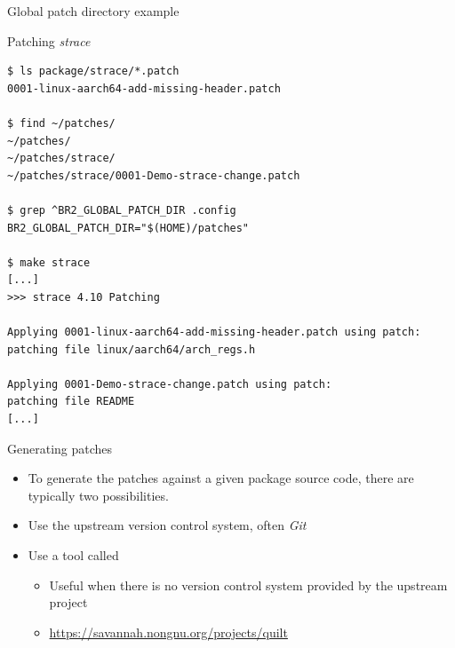 \begin{frame}[fragile]{Global patch directory example}

\begin{block}{Patching {\em strace}}
{\tiny
\begin{verbatim}
$ ls package/strace/*.patch
0001-linux-aarch64-add-missing-header.patch

$ find ~/patches/
~/patches/
~/patches/strace/
~/patches/strace/0001-Demo-strace-change.patch

$ grep ^BR2_GLOBAL_PATCH_DIR .config
BR2_GLOBAL_PATCH_DIR="$(HOME)/patches"

$ make strace
[...]
>>> strace 4.10 Patching

Applying 0001-linux-aarch64-add-missing-header.patch using patch: 
patching file linux/aarch64/arch_regs.h

Applying 0001-Demo-strace-change.patch using patch: 
patching file README
[...]
\end{verbatim}}
\end{block}

\end{frame}

\begin{frame}{Generating patches}
  \begin{itemize}
  \item To generate the patches against a given package source code,
    there are typically two possibilities.
  \item Use the upstream version control system, often {\em Git}
  \item Use a tool called 
    \begin{itemize}
    \item Useful when there is no version control system provided by
      the upstream project
    \item \url{https://savannah.nongnu.org/projects/quilt}
    \end{itemize}
  \end{itemize}
\end{frame}

